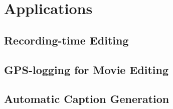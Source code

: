 \chapter{Applications}

\section{Recording-time Editing}

\section{GPS-logging for Movie Editing}

\section{Automatic Caption Generation}
